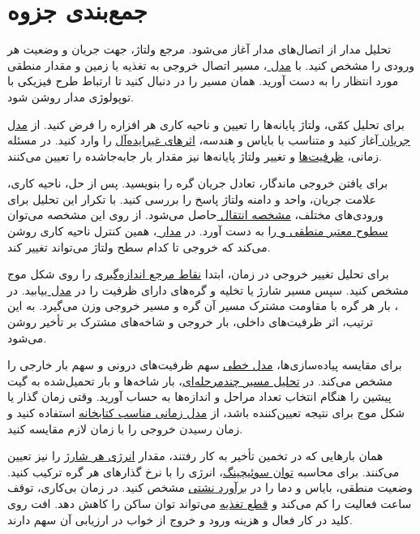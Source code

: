 \chapter*{جمع‌بندی جزوه}
{}

تحلیل مدار  از اتصال‌های مدار آغاز می‌شود. مرجع ولتاژ، جهت
جریان و وضعیت هر ورودی را مشخص کنید. با \hyperref[sec:book-cmos]{مدل
}، مسیر اتصال خروجی به تغذیه یا زمین و مقدار منطقی مورد
انتظار را به دست آورید. همان مسیر را در \hyperref[sec:book-fabrication]{}
دنبال کنید تا ارتباط طرح فیزیکی با توپولوژی مدار روشن شود.

برای تحلیل کمّی، ولتاژ پایانه‌ها را تعیین و ناحیه کاری هر افزاره را
فرض کنید. از \hyperref[sec:book-mos-current]{مدل جریان }
آغاز کنید و متناسب با بایاس و هندسه، \hyperref[sec:nonideal-current]{اثرهای
غیرایده‌آل} را وارد کنید. در مسئله زمانی، \hyperref[sec:book-cv]{ظرفیت‌ها}
و تغییر ولتاژ پایانه‌ها نیز مقدار بار جابه‌جاشده را تعیین می‌کنند.

برای یافتن خروجی ماندگار، تعادل جریان گره را بنویسید. پس از حل، ناحیه کاری،
علامت جریان، واحد و دامنه ولتاژ پاسخ را بررسی کنید. با تکرار این تحلیل برای
ورودی‌های مختلف، \hyperref[sec:dc-transfer]{مشخصه انتقال } حاصل
می‌شود. از روی این مشخصه می‌توان \hyperref[sec:noise-margin]{سطوح معتبر
منطقی و } را به دست آورد. در \hyperref[sec:pass-transistor]{مدار
}، همین کنترل ناحیه کاری روشن می‌کند که خروجی تا کدام
سطح ولتاژ می‌تواند تغییر کند.

برای تحلیل تغییر خروجی در زمان، ابتدا
\hyperref[sec:delay-waveform]{نقاط مرجع اندازه‌گیری} را روی شکل موج
مشخص کنید. سپس مسیر شارژ یا تخلیه و گره‌های دارای ظرفیت را در
\hyperref[sec:delay-rc-model]{مدل } بیابید.
در \hyperref[sec:delay-elmore]{}، بار هر گره با
مقاومت مشترک مسیر آن گره و مسیر خروجی وزن می‌گیرد. به این ترتیب،
اثر ظرفیت‌های داخلی، بار خروجی و شاخه‌های مشترک بر تأخیر روشن می‌شود.

برای مقایسه پیاده‌سازی‌ها،
\hyperref[sec:delay-linear-model]{مدل خطی} سهم ظرفیت‌های درونی و سهم
بار خارجی را مشخص می‌کند. در
\hyperref[sec:delay-path-model]{تحلیل مسیر چندمرحله‌ای}، بار شاخه‌ها
و بار تحمیل‌شده به گیت پیشین را هنگام انتخاب تعداد مراحل و اندازه‌ها
به حساب آورید. وقتی زمان گذار یا شکل موج برای نتیجه تعیین‌کننده باشد،
از \hyperref[sec:delay-timing-models]{مدل زمانی مناسب کتابخانه}
استفاده کنید و زمان رسیدن خروجی را با زمان لازم مقایسه کنید.

همان بارهایی که در تخمین تأخیر به کار رفتند، مقدار
\hyperref[sec:power-capacitor-energy]{انرژی هر شارژ} را نیز تعیین
می‌کنند. برای محاسبه \hyperref[sec:power-dynamic]{توان سوئیچینگ}،
انرژی را با نرخ گذارهای هر گره ترکیب کنید. وضعیت منطقی، بایاس و
دما را در \hyperref[sec:power-static]{برآورد نشتی} مشخص کنید.
در زمان بی‌کاری، توقف ساعت فعالیت را کم می‌کند و
\hyperref[sec:power-gating]{قطع تغذیه} می‌تواند توان ساکن را کاهش
دهد. افت روی کلید در کار فعال و هزینه ورود و خروج از خواب در
ارزیابی آن سهم دارند.


